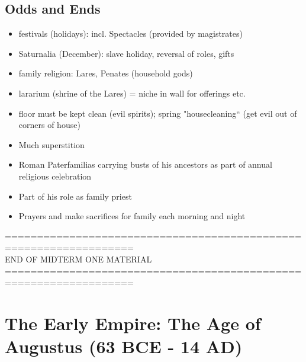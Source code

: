 \documentclass[12pt, twoside]{article}
\begin{document}
\subsection{Odds and Ends}
\begin{itemize}
\item festivals (holidays): incl. Spectacles (provided by magistrates)
\item Saturnalia (December): slave holiday, reversal of roles, gifts
\item family religion: Lares, Penates (household gods)
\item lararium (shrine of the Lares) = niche in wall for offerings etc.
\item floor must be kept clean (evil spirits); spring "housecleaning“ (get evil out of corners of house)
\item Much superstition
\item Roman Paterfamilias carrying busts of his ancestors as part of annual religious celebration
\item Part of his role as family priest
\item Prayers and make sacrifices for family each morning and night
\end{itemize}

================================================================== \\
END OF MIDTERM ONE MATERIAL \\
================================================================== \\

\section{The Early Empire: The Age of Augustus (63 BCE - 14 AD)}
\end{document}
